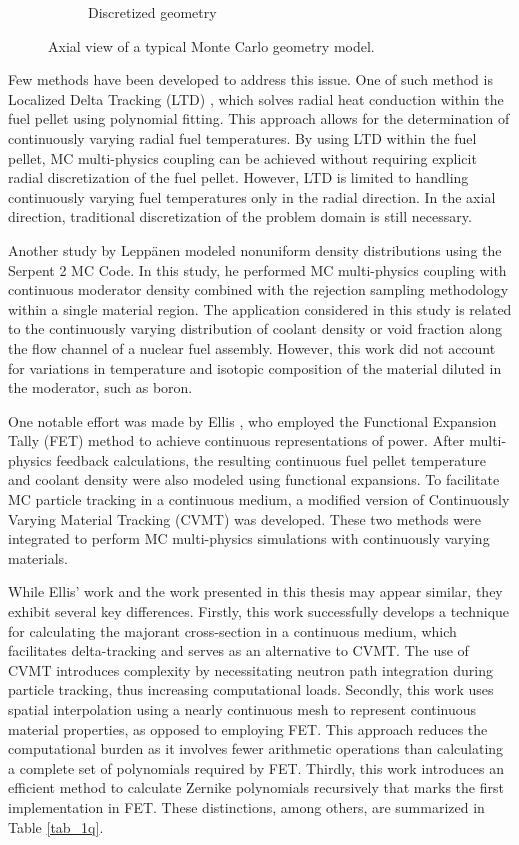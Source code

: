 \begin{figure}
\begin{subfigure}[b]{0.25\textwidth}
        \caption{Discretized geometry}
        \label{fig_1b}
    \end{subfigure}
    \caption{Axial view of a typical Monte Carlo geometry model.}
       \label{fig_1}
\end{figure}

Few methods have been developed to address this issue. One of such method is Localized Delta Tracking (LTD) \cite{nchoi_2020}, which solves radial heat conduction within the fuel pellet using polynomial fitting. This approach allows for the determination of continuously varying radial fuel temperatures. By using LTD within the fuel pellet, MC multi-physics coupling can be achieved without requiring explicit radial discretization of the fuel pellet. However, LTD is limited to handling continuously varying fuel temperatures only in the radial direction. In the axial direction, traditional discretization of the problem domain is still necessary.

Another study by Leppänen \cite{leppanen_2013} modeled nonuniform density distributions using the Serpent 2 MC Code. In this study, he performed MC multi-physics coupling with continuous moderator density combined with the rejection sampling methodology within a single material region. The application considered in this study is related to the continuously varying distribution of coolant density or void fraction along the flow channel of a nuclear fuel assembly. However, this work did not account for variations in temperature and isotopic composition of the material diluted in the moderator, such as boron.

One notable effort was made by Ellis \cite{ellis}, who employed the Functional Expansion Tally (FET) method \cite{chadsey,gries} to achieve continuous representations of power. After multi-physics feedback calculations, the resulting continuous fuel pellet temperature and coolant density were also modeled using functional expansions. To facilitate MC particle tracking in a continuous medium, a modified version of Continuously Varying Material Tracking (CVMT) \cite{brown} was developed. These two methods were integrated to perform MC multi-physics simulations with continuously varying materials.

While Ellis' work and the work presented in this thesis may appear similar, they exhibit several key differences. Firstly, this work successfully develops a technique for calculating the majorant cross-section in a continuous medium, which facilitates delta-tracking and serves as an alternative to CVMT. The use of CVMT introduces complexity by necessitating neutron path integration during particle tracking, thus increasing computational loads. Secondly, this work uses spatial interpolation using a nearly continuous mesh to represent continuous material properties, as opposed to employing FET. This approach reduces the computational burden as it involves fewer arithmetic operations than calculating a complete set of polynomials required by FET. Thirdly,  this work introduces an efficient method \cite{honarvar} to calculate Zernike polynomials recursively that marks the first implementation in FET. These distinctions, among others, are summarized in Table \ref{tab_1q}.

